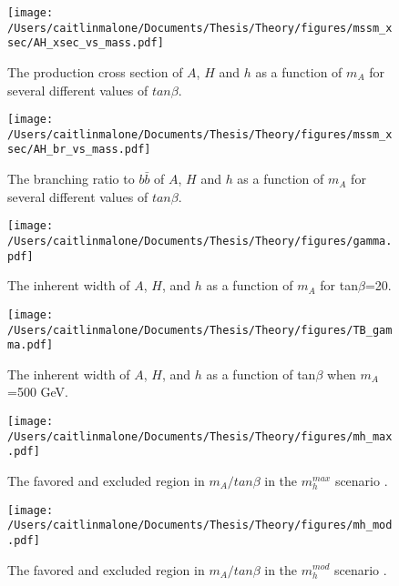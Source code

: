 \begin{figure}
	\centering
	\texttt{[image: /Users/caitlinmalone/Documents/Thesis/Theory/figures/mssm\_xsec/AH\_xsec\_vs\_mass.pdf]}
	\caption{The production cross section of $A$, $H$ and $h$ as a function of $m_A$ for several different values of $tan\beta$. \label{fig:xsec_vs_mass} }
\end{figure}




\begin{figure}
	\centering
	\texttt{[image: /Users/caitlinmalone/Documents/Thesis/Theory/figures/mssm\_xsec/AH\_br\_vs\_mass.pdf]}
	\caption{The branching ratio to $b\bar{b}$ of $A$, $H$ and $h$ as a function of $m_A$ for several different values of $tan\beta$. \label{fig:br_vs_mass} }
\end{figure}


\begin{figure}
	\centering
	\texttt{[image: /Users/caitlinmalone/Documents/Thesis/Theory/figures/gamma.pdf]}
	\caption{The inherent width of $A$, $H$, and $h$ as a function of $m_A$ for tan$\beta$=20. \label{fig:width}}
\end{figure}



\begin{figure}
	\centering
	\texttt{[image: /Users/caitlinmalone/Documents/Thesis/Theory/figures/TB\_gamma.pdf]}
	\caption{The inherent width of $A$, $H$, and $h$ as a function of tan$\beta$ when $m_A$=500 GeV. \label{fig:TB_width}}
\end{figure}



\begin{figure}
	\centering
	\texttt{[image: /Users/caitlinmalone/Documents/Thesis/Theory/figures/mh\_max.pdf]}
	\caption{The favored and excluded region in $m_A/tan\beta$ in the $m_h^{max}$ scenario \cite{Carena-2}. \label{fig:mh_max}}
\end{figure}


\begin{figure}
	\centering
	\texttt{[image: /Users/caitlinmalone/Documents/Thesis/Theory/figures/mh\_mod.pdf]}
	\caption{The favored and excluded region in $m_A/tan\beta$ in the $m_h^{mod}$ scenario \cite{Carena-2}. \label{fig:mh_mod}}
\end{figure}





